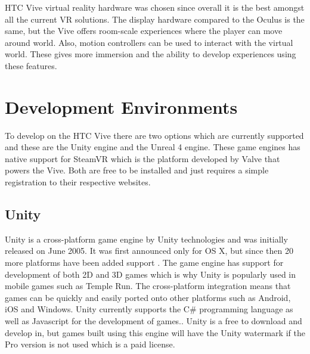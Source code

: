 HTC Vive virtual reality hardware was chosen since overall it is the best amongst all the current VR solutions. The display hardware compared to the Oculus is the same, but the Vive offers room-scale experiences where the player can move around world. Also, motion controllers can be used to interact with the virtual world. These gives more immersion and the ability to develop experiences using these features.

\clearpage
\section{Development Environments}
To develop on the HTC Vive there are two options which are currently supported and these are the Unity engine and the Unreal 4 engine\cite{vivedev}. These game engines has native support for SteamVR which is the platform developed by Valve that powers the Vive. Both are free to be installed and just requires a simple registration to their respective websites.

\subsection{Unity}
Unity is a cross-platform game engine by Unity technologies and was initially released on June 2005\cite{unitywiki}. It was first announced only for OS X, but since then 20 more platforms have been added support \cite{unityhistory}. The game engine has support for development of both 2D and 3D games which is why Unity is popularly used in mobile games such as Temple Run. The cross-platform integration means that games can be quickly and easily ported onto other platforms such as Android, iOS and Windows. Unity currently supports the C\# programming language as well as Javascript for the development of games.\cite{unity3d}. Unity is a free to download and develop in, but games built using this engine will have the Unity watermark if the Pro version is not used which is a paid license.

